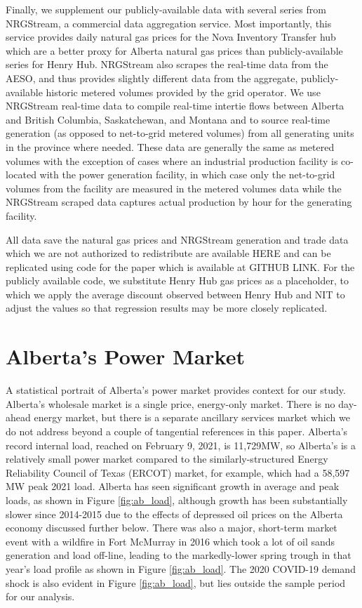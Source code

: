 \documentclass[12pt]{article}
\begin{document}
Finally, we supplement our publicly-available data with several series from NRGStream, a commercial data aggregation service. Most importantly, this service provides daily natural gas prices for the Nova Inventory Transfer hub which are a better proxy for Alberta natural gas prices than publicly-available series for Henry Hub. NRGStream also scrapes the real-time data from the AESO, and thus provides slightly different data from the aggregate, publicly-available historic metered volumes provided by the grid operator. We use NRGStream real-time data to compile real-time intertie flows between Alberta and British Columbia, Saskatchewan, and Montana and to source real-time generation (as opposed to net-to-grid metered volumes) from all generating units in the province where needed. These data are generally the same as metered volumes with the exception of cases where an industrial production facility is co-located with the power generation facility, in which case only the net-to-grid volumes from the facility are measured in the metered volumes data while the NRGStream scraped data captures actual production by hour for the generating facility.

All data save the natural gas prices and NRGStream generation and trade data which we are not authorized to redistribute are available HERE and can be replicated using code for the paper which is available at GITHUB LINK. For the publicly available code, we substitute Henry Hub gas prices as a placeholder, to which we apply the average discount observed between Henry Hub and NIT to adjust the values so that regression results may be more closely replicated.

\section{Alberta's Power Market}\label{sec:market}

A statistical portrait of Alberta's power market provides context for our study. Alberta's wholesale market is a single price, energy-only market. There is no day-ahead energy market, but there is a separate ancillary services market which we do not address beyond a couple of tangential references in this paper. Alberta's record internal load, reached on February 9, 2021, is 11,729MW, so Alberta's is a relatively small power market compared to the similarly-structured Energy Reliability Council of Texas (ERCOT) market, for example, which had a 58,597 MW peak 2021 load. Alberta has seen significant growth in average and peak loads, as shown in Figure \ref{fig:ab_load}, although growth has been substantially slower since 2014-2015 due to the effects of depressed oil prices on the Alberta economy discussed further below. There was also a major, short-term market event with a wildfire in Fort McMurray in 2016 which took a lot of oil sands generation and load off-line, leading to the markedly-lower spring trough in that year's load profile as shown in Figure \ref{fig:ab_load}. The 2020 COVID-19 demand shock is also evident in Figure \ref{fig:ab_load}, but lies outside the sample period for our analysis.
\end{document}
